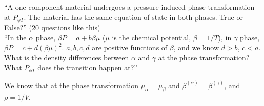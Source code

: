 \documentclass[12pt]{article}
\begin{document}
``A one component material undergoes a pressure induced phase transformation at $P_{\phi T}$.  The material has the same equation of state in both phases.  True or False?'' (20 questions like this)\\

``In the $\alpha$ phase, $\beta P = a + b \beta \mu$ ($\mu$ is the chemical potential, $\beta = 1/T$), in $\gamma$ phase, $\beta P = c + d (\beta \mu)^2$.  $a,b,c,d$ are positive functions of $\beta$, and we know $d > b$, $c < a$.  What is the density differences between $\alpha$ and $\gamma$ at the phase transformation?  What $P_{\phi T}$ does the transition happen at?''

 We know that at the phase transformation $\mu_\alpha = \mu_\beta$ and $\beta^{(\alpha)} = \beta^{(\gamma)}$, and $\rho = 1/V$.

\end{document}
